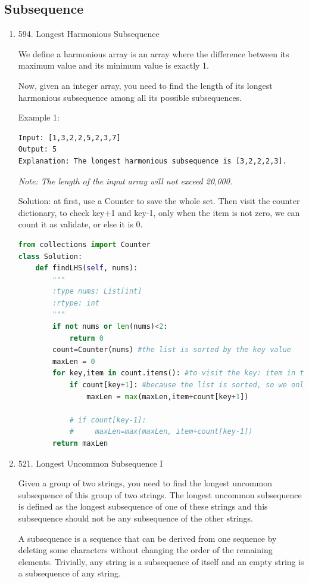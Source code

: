 \documentclass[../specific-algorithms.tex]{subfiles}
\begin{document}
\subsection{Subsequence}
\begin{enumerate}
    \item 594. Longest Harmonious Subsequence

We define a harmonious array is an array where the difference between its maximum value and its minimum value is exactly 1.

Now, given an integer array, you need to find the length of its longest harmonious subsequence among all its possible subsequences.

Example 1:
\begin{lstlisting}
Input: [1,3,2,2,5,2,3,7]
Output: 5
Explanation: The longest harmonious subsequence is [3,2,2,2,3].
\end{lstlisting}

\textit{Note: The length of the input array will not exceed 20,000.}

Solution: at first, use a Counter to save the whole set. Then visit the counter dictionary, to check key+1 and key-1, only when the item is not zero, we can count it as validate, or else it is 0.
\begin{lstlisting}[language = Python]
from collections import Counter
class Solution:
    def findLHS(self, nums):
        """
        :type nums: List[int]
        :rtype: int
        """
        if not nums or len(nums)<2:
            return 0
        count=Counter(nums) #the list is sorted by the key value
        maxLen = 0
        for key,item in count.items(): #to visit the key: item in the counter
            if count[key+1]: #because the list is sorted, so we only need to check key+1
                maxLen = max(maxLen,item+count[key+1])
            
            # if count[key-1]:
            #     maxLen=max(maxLen, item+count[key-1])
        return maxLen
\end{lstlisting}

\item 521. Longest Uncommon Subsequence I

Given a group of two strings, you need to find the longest uncommon subsequence of this group of two strings. The longest uncommon subsequence is defined as the longest subsequence of one of these strings and this subsequence should not be any subsequence of the other strings.

A subsequence is a sequence that can be derived from one sequence by deleting some characters without changing the order of the remaining elements. Trivially, any string is a subsequence of itself and an empty string is a subsequence of any string.


\end{enumerate}
\end{document}
